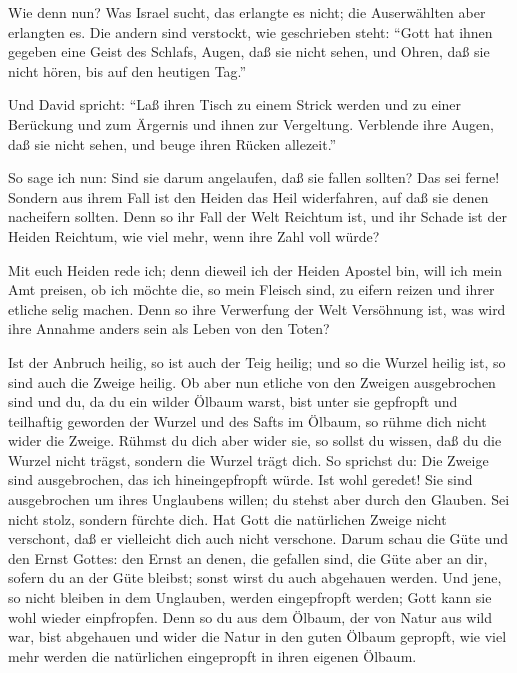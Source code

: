  Wie denn nun? Was Israel sucht, das erlangte es nicht; die
Auserwählten aber erlangten es. Die andern sind verstockt, 
wie geschrieben steht: ``Gott hat ihnen gegeben eine Geist des Schlafs,
Augen, daß sie nicht sehen, und Ohren, daß sie nicht hören, bis auf den
heutigen Tag.''

 Und David spricht: ``Laß ihren Tisch zu einem Strick werden
und zu einer Berückung und zum Ärgernis und ihnen zur Vergeltung.
 Verblende ihre Augen, daß sie nicht sehen, und beuge ihren
Rücken allezeit.''

 So sage ich nun: Sind sie darum angelaufen, daß sie fallen
sollten? Das sei ferne! Sondern aus ihrem Fall ist den Heiden das Heil
widerfahren, auf daß sie denen nacheifern sollten.  Denn so
ihr Fall der Welt Reichtum ist, und ihr Schade ist der Heiden Reichtum,
wie viel mehr, wenn ihre Zahl voll würde?

 Mit euch Heiden rede ich; denn dieweil ich der Heiden
Apostel bin, will ich mein Amt preisen,  ob ich möchte die,
so mein Fleisch sind, zu eifern reizen und ihrer etliche selig machen.
 Denn so ihre Verwerfung der Welt Versöhnung ist, was wird
ihre Annahme anders sein als Leben von den Toten?

 Ist der Anbruch heilig, so ist auch der Teig heilig; und
so die Wurzel heilig ist, so sind auch die Zweige heilig. 
Ob aber nun etliche von den Zweigen ausgebrochen sind und du, da du ein
wilder Ölbaum warst, bist unter sie gepfropft und teilhaftig geworden
der Wurzel und des Safts im Ölbaum,  so rühme dich nicht
wider die Zweige. Rühmst du dich aber wider sie, so sollst du wissen,
daß du die Wurzel nicht trägst, sondern die Wurzel trägt dich.
 So sprichst du: Die Zweige sind ausgebrochen, das ich
hineingepfropft würde.  Ist wohl geredet! Sie sind
ausgebrochen um ihres Unglaubens willen; du stehst aber durch den
Glauben. Sei nicht stolz, sondern fürchte dich.  Hat Gott
die natürlichen Zweige nicht verschont, daß er vielleicht dich auch
nicht verschone.  Darum schau die Güte und den Ernst
Gottes: den Ernst an denen, die gefallen sind, die Güte aber an dir,
sofern du an der Güte bleibst; sonst wirst du auch abgehauen werden.
 Und jene, so nicht bleiben in dem Unglauben, werden
eingepfropft werden; Gott kann sie wohl wieder einpfropfen.
 Denn so du aus dem Ölbaum, der von Natur aus wild war,
bist abgehauen und wider die Natur in den guten Ölbaum gepropft, wie
viel mehr werden die natürlichen eingepropft in ihren eigenen Ölbaum.

